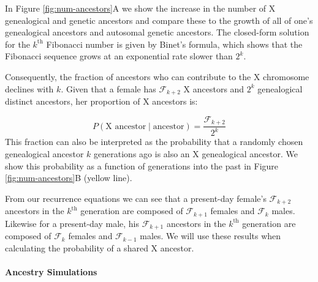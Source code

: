 \documentclass[11pt]{article}
\begin{document}


In Figure \ref{fig:num-ancestors}A we show the increase in the number of X
genealogical and genetic ancestors and compare these to the growth of all of
one's genealogical ancestors and autosomal genetic ancestors. The closed-form
solution for the $k^\text{th}$ Fibonacci number is given by Binet's formula,
which shows that the Fibonacci sequence grows at an exponential rate slower
than $2^k$. 

Consequently, the fraction of ancestors who can contribute to the X chromosome
declines with $k$. Given that a female has $\mathcal{F}_{k+2}$ X ancestors and
$2^k$ genealogical distinct ancestors, her proportion of X ancestors is:

\begin{equation}
  \label{eq:prob-x-anc}
  P(\text{X ancestor} \;|\; \text{ancestor}) = \frac{\mathcal{F}_{k+2}}{2^k} 
\end{equation}
%
This fraction can also be interpreted as the probability that a randomly chosen
genealogical ancestor $k$ generations ago is also an X genealogical ancestor.
We show this probability as a function of generations into the past in Figure
\ref{fig:num-ancestors}B (yellow line).

From our recurrence equations we can see that a present-day female's
$\mathcal{F}_{k+2}$ ancestors in the $k^\text{th}$ generation are composed of
$\mathcal{F}_{k+1}$ females and $\mathcal{F}_{k}$ males. Likewise for a
present-day male, his $\mathcal{F}_{k+1}$ ancestors in the $k^\text{th}$
generation are composed of $\mathcal{F}_{k}$ females and $\mathcal{F}_{k-1}$
males. We will use these results when calculating the probability of a shared X
ancestor.

\paragraph{Ancestry Simulations} 
\end{document}
